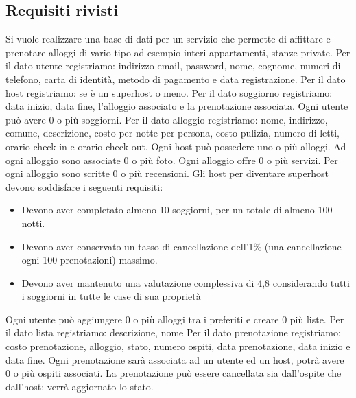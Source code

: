 \subsection{Requisiti rivisti}
Si vuole realizzare una base di dati per un servizio che permette di affittare e prenotare
alloggi di vario tipo ad esempio interi appartamenti, stanze private.
\newline
\newline
Per il dato utente registriamo: indirizzo email, password, nome, cognome, numeri di telefono, carta di identità, metodo di pagamento e data registrazione.
\newline
\newline
Per il dato host registriamo: se è un superhost o meno.
\newline
\newline
Per il dato soggiorno registriamo: data inizio, data fine, l'alloggio associato e la prenotazione associata.
Ogni utente può avere 0 o più soggiorni.
\newline
\newline
Per il dato alloggio registriamo: nome, indirizzo, comune, descrizione, costo per notte per persona, costo pulizia, numero di letti, orario check-in e orario check-out.
Ogni host può possedere uno o più alloggi. Ad ogni alloggio sono associate 0 o più foto. Ogni alloggio offre 0 o più servizi. Per ogni alloggio sono scritte 0 o più recensioni.
\newline
\newline
Gli host per diventare superhost devono soddisfare i  seguenti requisiti:
\begin{itemize}
    \item Devono aver completato almeno 10 soggiorni, per un totale di almeno 100 notti.
    \item Devono aver conservato un tasso di cancellazione dell'1\% 
    (una cancellazione ogni 100 prenotazioni) massimo.
    \item Devono aver mantenuto una valutazione complessiva di 4,8 considerando 
    tutti i soggiorni in tutte le case di sua proprietà
\end{itemize}
Ogni utente può aggiungere 0 o più alloggi tra i preferiti e creare 0 più liste.
Per il dato lista registriamo: descrizione, nome
\newline
\newline
Per il dato prenotazione registriamo: costo prenotazione, alloggio, stato, numero ospiti, data prenotazione, data inizio e data fine. Ogni prenotazione sarà associata ad un utente ed un host, potrà avere 0 o più ospiti associati. La prenotazione può essere cancellata sia dall'ospite che dall'host: verrà aggiornato lo stato.
